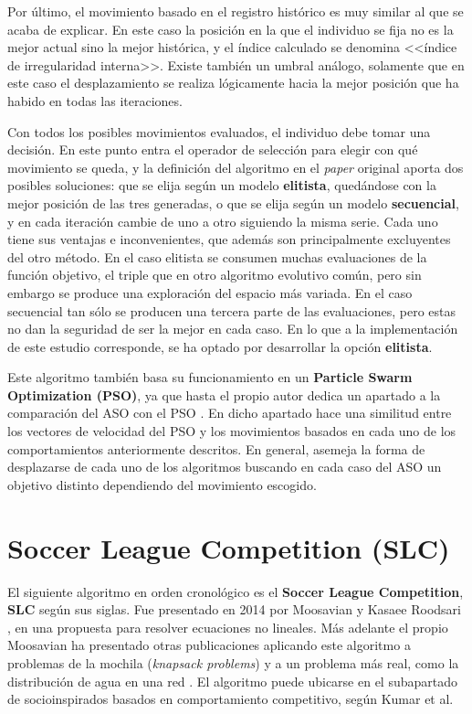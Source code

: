 Por último, el movimiento basado en el registro histórico es muy similar al que se acaba de explicar. En este caso la posición en la que el individuo se fija no es la mejor actual sino la mejor histórica, y el índice calculado se denomina <<índice de irregularidad interna>>. Existe también un umbral análogo, solamente que en este caso el desplazamiento se realiza lógicamente hacia la mejor posición que ha habido en todas las iteraciones.

Con todos los posibles movimientos evaluados, el individuo debe tomar una decisión. En este punto entra el operador de selección para elegir con qué movimiento se queda, y la definición del algoritmo en el \textit{paper} original aporta dos posibles soluciones: que se elija según un modelo \textbf{elitista}, quedándose con la mejor posición de las tres generadas, o que se elija según un modelo \textbf{secuencial}, y en cada iteración cambie de uno a otro siguiendo la misma serie. Cada uno tiene sus ventajas e inconvenientes, que además son principalmente excluyentes del otro método. En el caso elitista se consumen muchas evaluaciones de la función objetivo, el triple que en otro algoritmo evolutivo común, pero sin embargo se produce una exploración del espacio más variada. En el caso secuencial tan sólo se producen una tercera parte de las evaluaciones, pero estas no dan la seguridad de ser la mejor en cada caso. En lo que a la implementación de este estudio corresponde, se ha optado por desarrollar la opción \textbf{elitista}.

Este algoritmo también basa su funcionamiento en un \textbf{Particle Swarm Optimization (PSO)}, ya que hasta el propio autor dedica un apartado a la comparación del ASO con el PSO \cite{aso-conference}. En dicho apartado hace una similitud entre los vectores de velocidad del PSO y los movimientos basados en cada uno de los comportamientos anteriormente descritos. En general, asemeja la forma de desplazarse de cada uno de los algoritmos buscando en cada caso del ASO un objetivo distinto dependiendo del movimiento escogido.

\section{Soccer League Competition (SLC)}

El siguiente algoritmo en orden cronológico es el \textbf{Soccer League Competition}, \textbf{SLC} según sus siglas. Fue presentado en 2014 por Moosavian y Kasaee Roodsari \cite{slc-nonlinear-eq}, en una propuesta para resolver ecuaciones no lineales. Más adelante el propio Moosavian ha presentado otras publicaciones aplicando este algoritmo a problemas de la mochila (\textit{knapsack problems}) \cite{slc-knapsack} y a un problema más real, como la distribución de agua en una red \cite{slc-article}. El algoritmo puede ubicarse en el subapartado de socioinspirados basados en comportamiento competitivo, según Kumar et al. \cite{socio-evolution-algorithm}

